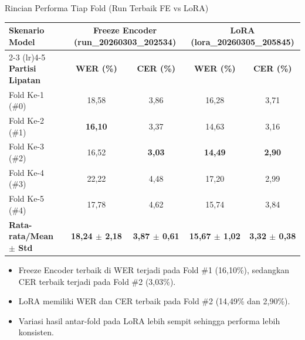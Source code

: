 \begin{frame}{Rincian Performa Tiap Fold (Run Terbaik FE vs LoRA)}
    \begin{center}
        \scriptsize
        \begin{tabular}{lcccc}
            \toprule
            \textbf{Skenario Model} & \multicolumn{2}{c}{\textbf{Freeze Encoder (run\_20260303\_202534)}} & \multicolumn{2}{c}{\textbf{LoRA (lora\_20260305\_205845)}} \\
            \cmidrule(lr){2-3} \cmidrule(lr){4-5}
            \textbf{Partisi Lipatan} & \textbf{WER (\%)} & \textbf{CER (\%)} & \textbf{WER (\%)} & \textbf{CER (\%)} \\
            \midrule
            Fold Ke-1 (\#0) & 18,58 & 3,86 & 16,28 & 3,71 \\
            Fold Ke-2 (\#1) & \textbf{16,10} & 3,37 & 14,63 & 3,16 \\
            Fold Ke-3 (\#2) & 16,52 & \textbf{3,03} & \textbf{14,49} & \textbf{2,90} \\
            Fold Ke-4 (\#3) & 22,22 & 4,48 & 17,20 & 2,99 \\
            Fold Ke-5 (\#4) & 17,78 & 4,62 & 15,74 & 3,84 \\
            \midrule
            \textbf{Rata-rata/Mean $\pm$ Std} & \textbf{18,24 $\pm$ 2,18} & \textbf{3,87 $\pm$ 0,61} & \textbf{15,67 $\pm$ 1,02} & \textbf{3,32 $\pm$ 0,38} \\
            \bottomrule
        \end{tabular}
    \end{center}
    \vspace{0.2cm}
    \begin{itemize}
        \small
        \item Freeze Encoder terbaik di WER terjadi pada Fold \#1 (16,10\%), sedangkan CER terbaik terjadi pada Fold \#2 (3,03\%).
        \item LoRA memiliki WER dan CER terbaik pada Fold \#2 (14,49\% dan 2,90\%).
        \item Variasi hasil antar-fold pada LoRA lebih sempit sehingga performa lebih konsisten.
    \end{itemize}
\end{frame}

